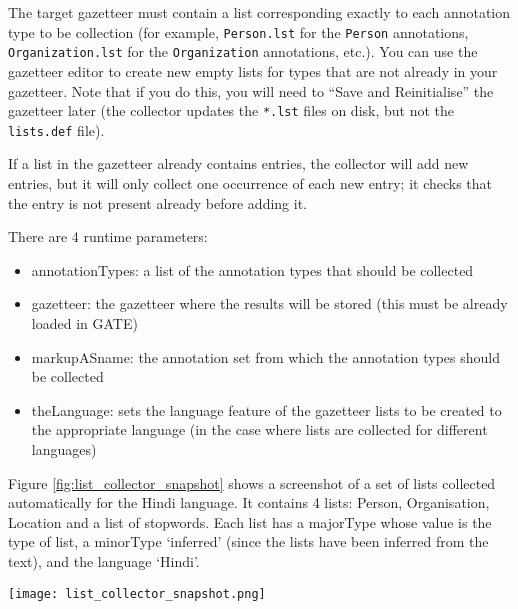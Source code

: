 The target gazetteer must contain a list corresponding exactly to each
annotation type to be collection (for example, \texttt{Person.lst} for the
\texttt{Person} annotations, \texttt{Organization.lst} for the
\texttt{Organization} annotations, etc.).  You can use the gazetteer editor to
create new empty lists for types that are not already in your gazetteer.  Note
that if you do this, you will need to ``Save and Reinitialise'' the gazetteer
later (the collector updates the \texttt{*.lst} files on disk, but not the
\texttt{lists.def} file).

If a list in the gazetteer already contains entries, the collector will add new
entries, but it will only collect one occurrence of each new entry; it checks
that the entry is not present already before adding it.


There are 4 runtime parameters:
\begin{itemize}
\item annotationTypes: a list of the annotation types that should be collected
\item gazetteer: the gazetteer where the results will be stored (this must be
  already loaded in GATE)
\item markupASname: the annotation set from which the annotation types should be
  collected
\item theLanguage: sets the language feature of the gazetteer lists to be
  created to the appropriate language (in the case where lists are collected for
  different languages)
\end{itemize}

Figure \ref{fig:list_collector_snapshot} shows a screenshot of a set of lists
collected automatically for the Hindi language. It contains 4 lists: Person,
Organisation, Location and a list of stopwords. Each list has a majorType whose
value is the type of list, a minorType `inferred' (since the lists have been
inferred from the text), and the language `Hindi'.
\begin{figure*}[htbp]
\begin{center}
\texttt{[image: list\_collector\_snapshot.png]}
\end{center}
\caption{Lists collected automatically for Hindi}
\label{fig:list_collector_snapshot}
\end{figure*}


